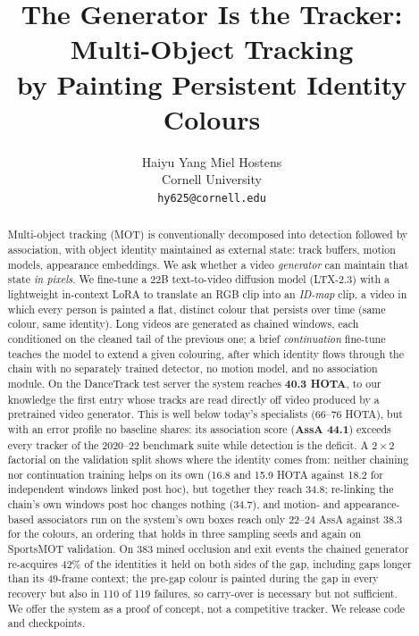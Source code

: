 \documentclass{article} %
\title{The Generator Is the Tracker: Multi-Object Tracking\\by Painting Persistent Identity Colours}
\author{Haiyu Yang \quad Miel Hostens \\
Cornell University \\
\texttt{hy625@cornell.edu}
}
\newcommand{\rev}[1]{#1}
\begin{document}
\maketitle

\begin{abstract}
Multi-object tracking (MOT) is conventionally decomposed into detection followed by
association, with object identity maintained as external state: track buffers, motion
models, appearance embeddings. We ask whether a video \emph{generator} can maintain that
state \emph{in pixels}. We fine-tune a 22B text-to-video diffusion model (LTX-2.3) with a
lightweight in-context LoRA to translate an RGB clip into an \emph{ID-map} clip, a video in
which every person is painted a flat, distinct colour that persists over time (same
colour, same identity). Long videos are generated as chained windows, each conditioned on
the cleaned tail of the previous one; a brief \emph{continuation} fine-tune teaches the
model to extend a given colouring, after which identity flows through the chain with no
separately trained detector, no motion model, and no association module. On the DanceTrack
test server the system reaches \textbf{40.3 HOTA}, to our knowledge the first entry whose
tracks are read directly off video produced by a pretrained video generator. This is well
below today's specialists (66--76 HOTA), but with an error profile no baseline shares: its
association score (\textbf{AssA 44.1}) exceeds every tracker of the 2020--22 benchmark
suite while detection is the deficit. \rev{A $2\times2$ factorial} on the
validation split shows where the identity comes from: \rev{neither chaining nor continuation
training helps on its own (16.8 and 15.9 HOTA against 18.2 for independent windows linked
post hoc), but together they reach 34.8}; re-linking the chain's own windows post hoc changes
nothing (34.7), and motion- and appearance-based associators run on the system's own boxes
reach only 22--24 AssA \rev{against 38.3 for the colours}, an ordering that holds \rev{in three sampling
seeds and} again on SportsMOT validation. On 383 mined occlusion \rev{and exit} events the chained
generator re-acquires 42\% of the identities it held on both sides of the gap, including
gaps longer than its 49-frame context\rev{; the pre-gap colour is painted during the gap in
every recovery but also in 110 of 119 failures, so carry-over is necessary but not
sufficient. We offer the system as a proof of concept, not a competitive tracker}. We
release code and checkpoints.
\end{abstract}
\end{document}
